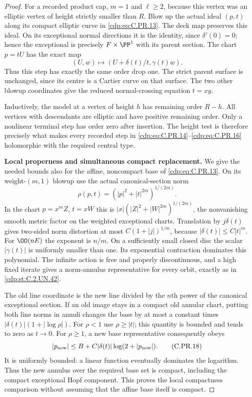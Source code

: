 \begin{proof}
For a recorded product cap, $m=1$ and $\ell\ge2$, because this
vertex was an elliptic vertex of height strictly smaller than $R$.
Blow up the actual ideal $(p,t)$ along its compact elliptic
curve in \eqref{cdp:eq:C.PR.13}. The deck map preserves this ideal.
On its exceptional normal directions it is the identity,
since $\delta'(0)=0$; hence the exceptional is precisely
$F\times\PP^1$ with its parent section. The chart $p=tU$
has the exact map
\[
                    (U,w)\longmapsto
          (U+\delta(t)/t,\gamma(t)w).                   \tag{C.PR.16}\label{cdp:eq:C.PR.16}
\]
Thus this step has exactly the same order drop one. The strict
parent surface is unchanged, since its centre is a Cartier
curve on that surface. The two other blowup coordinates give
the reduced normal-crossing equation $t=xy$.

Inductively, the model at a vertex of height $h$ has remaining
order $R-h$. All vertices with descendants are elliptic and
have positive remaining order. Only a nonlinear terminal step
has order zero after insertion. The height test is therefore
precisely what makes every recorded step in \eqref{cdp:eq:C.PR.14}--\eqref{cdp:eq:C.PR.16}
holomorphic with the required central type.

\par\medskip\noindent\textbf{Local properness and simultaneous compact replacement.}
We give the needed bounds also for the affine, noncompact base
of \eqref{cdp:eq:C.PR.13}. On its weight-$(m,1)$ blowup use the actual
canonical-section norm
\[
                  \rho(p,t)=
                  (|p|^2+|t|^{2m})^{1/(2m)}.           \tag{C.PR.17}\label{cdp:eq:C.PR.17}
\]
In the chart $p=x^mZ$, $t=xW$ this is
$|x|(|Z|^2+|W|^{2m})^{1/(2m)}$, the nonvanishing smooth
metric factor on the weighted exceptional charts. Translation
by $j\delta(t)$ gives two-sided norm distortion at most
$C(1+|j|)^{1/m}$, because $|\delta(t)|\le C|t|^m$.
For $\OO(nE)$ the exponent is $n/m$. On a sufficiently small
closed disc the scalar $|\gamma(t)|$ is uniformly smaller
than one. Its exponential contraction dominates this polynomial.
The infinite action is free and properly discontinuous, and
a high fixed iterate gives a norm-annulus representative for
every orbit, exactly as in \ref{cdp:st:C.2.UN.42}.

The old line coordinate is the new line divided by the $n$th
power of the canonical exceptional section. If an old image
stays in a compact old annular chart, putting both line norms
in annuli changes the base by at most a constant times
$|\delta(t)|(1+|\log\rho|)$. For $\rho<1$ use $\rho\ge|t|$;
this quantity is bounded and tends to zero as $t\to0$.
For $\rho\ge1$, a new base representative consequently obeys
\[
 |p_{\rm new}|\le B+C|\delta(t)|\log(2+|p_{\rm new}|).
                                                        \tag{C.PR.18}\label{cdp:eq:C.PR.18}
\]
It is uniformly bounded: a linear function eventually dominates
the logarithm. Thus the new annulus over the required base set
is compact, including the compact exceptional Hopf component.
This proves the local compactness comparison without assuming
that the affine base itself is compact.


\end{proof}
